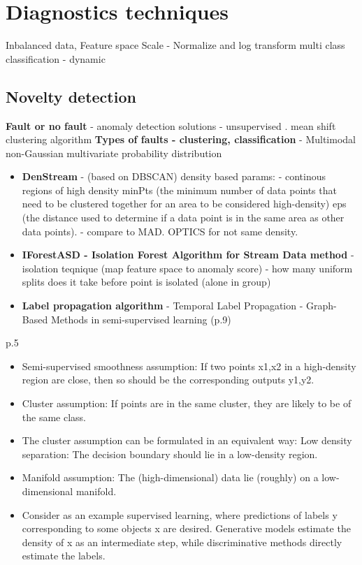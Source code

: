 \section{Diagnostics techniques}
Inbalanced data, Feature space
Scale  -  Normalize and log transform
multi class classification - dynamic 


\subsection{Novelty detection}
\textbf{Fault or no fault} - anomaly detection solutions - unsupervised \cite{torres_automatic_2022}. mean shift clustering algorithm
\textbf{Types of faults - clustering, classification} - Multimodal non-Gaussian multivariate probability distribution

\begin{itemize}
\item \textbf{DenStream} - (based on DBSCAN)  density based params: - continous regions of high density
	minPts (the minimum number of data points that need to be clustered together for an area to be considered high-density)
	eps (the distance used to determine if a data point is in the same area as other data points). - compare to MAD. OPTICS for not same density.
\item \textbf{IForestASD - Isolation Forest Algorithm for Stream Data method} - isolation teqnique (map feature space to anomaly score) - how many uniform splits does it take before point is isolated (alone in group)
\item \textbf{Label propagation algorithm} - Temporal Label Propagation - Graph-Based Methods in semi-supervised learning (p.9)
\end{itemize}




\cite{chapelle_semi-supervised_2006}
p.5
\begin{itemize}
\item Semi-supervised smoothness assumption: If two points x1,x2 in a high-density region are close, then so should be the corresponding outputs y1,y2. 
\item Cluster assumption: If points are in the same cluster, they are likely to be of the same class.
\item The cluster assumption can be formulated in an equivalent way: Low density separation: The decision boundary should lie in a low-density region.
\item Manifold assumption: The (high-dimensional) data lie (roughly) on a low-dimensional manifold.
\item Consider as an example supervised learning, where predictions of labels y corresponding to some objects x are desired. Generative models estimate the density of x as an intermediate step, while discriminative methods directly estimate the labels.
\end{itemize} 

